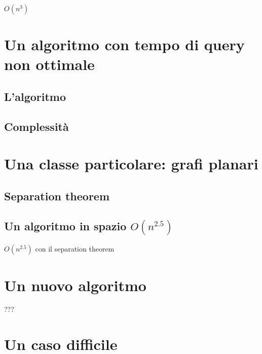 \documentclass[a4paper,10pt]{amsbook}
\theoremstyle{plain}
\theoremstyle{definition}
\theoremstyle{remark}
\begin{document}
$O(n^3)$

\section{Un algoritmo con tempo di query non ottimale}

\subsection{L'algoritmo}

\subsection{Complessità}

\section{Una classe particolare: grafi planari}

\subsection{Separation theorem}

\subsection{Un algoritmo in spazio $O(n^{2.5})$}

$O(n^{2.5})$ con il separation theorem

\section{Un nuovo algoritmo}

???

\section{Un caso difficile}
\end{document}
